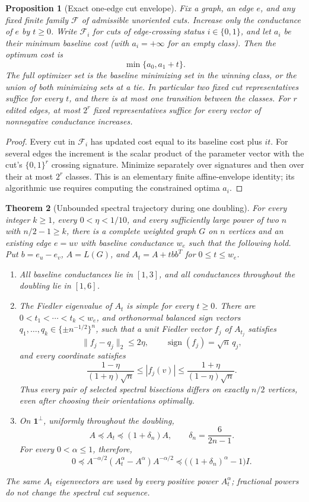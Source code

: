 \documentclass[11pt]{article}
\newtheorem{theorem}{Theorem}
\newtheorem{proposition}[theorem]{Proposition}
\newcommand{\one}{\boldsymbol 1}
\begin{document}
\begin{proposition}[Exact one-edge cut envelope]\label{prop:envelope}
Fix a graph, an edge $e$, and any fixed finite family $\mathcal F$ of
admissible unoriented cuts. Increase only the conductance of $e$ by
$t\ge0$. Write $\mathcal F_i$ for cuts of edge-crossing status
$i\in\{0,1\}$, and let $a_i$ be their minimum baseline cost
(with $a_i=+\infty$ for an empty class). Then the optimum cost is
\[
                        \min\{a_0,a_1+t\}.
\]
The full optimizer set is the baseline minimizing set in the winning
class, or the union of both minimizing sets at a tie. In particular two
fixed cut representatives suffice for every $t$, and there is at most
one transition between the classes. For $r$ edited edges, at most
$2^r$ fixed representatives suffice for every vector of nonnegative
conductance increases.
\end{proposition}
\begin{proof}
Every cut in $\mathcal F_i$ has updated cost equal to its baseline
cost plus $it$. For several edges the increment is the scalar product
of the parameter vector with the cut's $\{0,1\}^r$ crossing signature.
Minimize separately over signatures and then over their at most $2^r$
classes. This is an elementary finite affine-envelope identity; its
algorithmic use requires computing the constrained optima $a_i$.
\end{proof}

\begin{theorem}[Unbounded spectral trajectory during one doubling]
\label{thm:trajectory}
For every integer $k\ge1$, every $0<\eta<1/10$, and every sufficiently
large power of two $n$ with $n/2-1\ge k$, there is a complete weighted
graph $G$ on $n$ vertices and an existing edge $e=uv$ with baseline
conductance $w_e$ such that the following hold. Put
$b=e_u-e_v$, $A=L(G)$, and $A_t=A+tbb^T$ for $0\le t\le w_e$.
\begin{enumerate}
\item All baseline conductances lie in $[1,3]$, and all conductances
throughout the doubling lie in $[1,6]$.
\item The Fiedler eigenvalue of $A_t$ is simple for every $t\ge0$.
There are $0<t_1<\cdots<t_k<w_e$, and orthonormal balanced sign
vectors $q_1,\ldots,q_k\in\{\pm n^{-1/2}\}^n$, such that a unit
Fiedler vector $f_j$ of $A_{t_j}$ satisfies
\[
 \|f_j-q_j\|_2\le2\eta,\qquad
 \operatorname{sign}(f_j)=\sqrt n\,q_j,
\]
and every coordinate satisfies
\[
 \frac{1-\eta}{(1+\eta)\sqrt n}
 \le |f_j(v)|\le
 \frac{1+\eta}{(1-\eta)\sqrt n}.
\]
Thus every pair of selected spectral bisections differs on exactly
$n/2$ vertices, even after choosing their orientations optimally.
\item On $\one^\perp$, uniformly throughout the doubling,
\[
 A\preceq A_t\preceq(1+\delta_n)A,
 \qquad \delta_n=\frac6{2n-1}.
\]
For every $0<\alpha\le1$, therefore,
\[
 0\preceq A^{-\alpha/2}(A_t^\alpha-A^\alpha)A^{-\alpha/2}
 \preceq\bigl((1+\delta_n)^\alpha-1\bigr)I.
\]
\end{enumerate}
The same $A_t$ eigenvectors are used by every positive power $A_t^\alpha$;
fractional powers do not change the spectral cut sequence.
\end{theorem}
\end{document}

